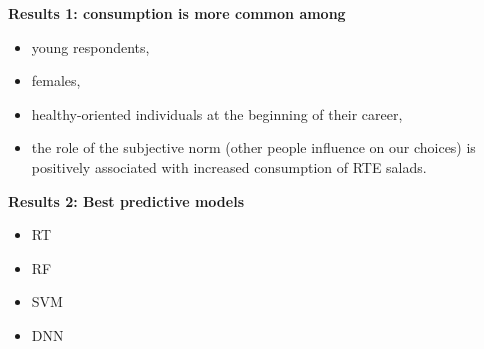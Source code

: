 \documentclass[12pt]{beamer}
\begin{document}
 \begin{frame}
 	\footnotesize
\textbf{Results 1: consumption is more common among}
\begin{itemize}
	\item young respondents,  
	\item females,
	\item healthy-oriented individuals at the beginning of their career,
	\item the role of the subjective norm (other people influence on our choices) is positively associated with increased consumption of RTE salads. 
\end{itemize}		

\textbf{Results 2: Best predictive models}
\begin{itemize}
	\item RT
	\item RF
	\item SVM
	\item DNN
\end{itemize}		 	
\end{frame}
\end{document}
